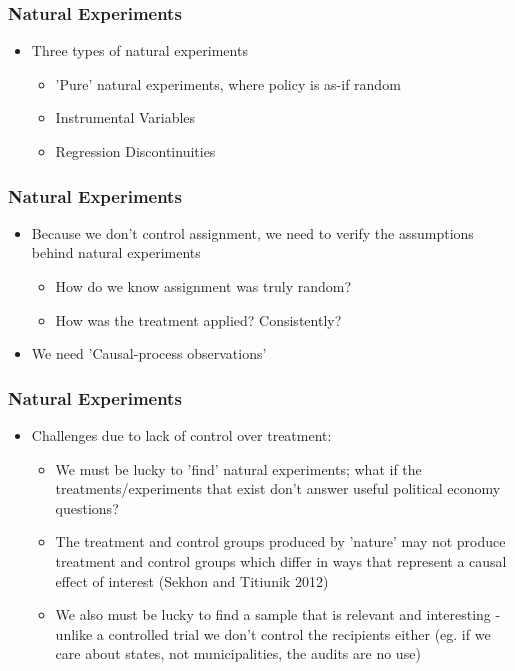 \documentclass[xcolor=x11names,compress]{beamer}\usepackage[]{graphicx}\usepackage[]{color}
\renewcommand{\(}{\begin{columns}}
\renewcommand{\)}{\end{columns}}
\newcommand{\<}[1]{\begin{column}{#1}}
\renewcommand{\>}{\end{column}}
\begin{document}
\begin{frame}
\frametitle{Natural Experiments}
\begin{itemize}
\item Three types of natural experiments
\begin{itemize}
\item 'Pure' natural experiments, where policy is as-if random
\item Instrumental Variables
\item Regression Discontinuities
\end{itemize}
\end{itemize}
\end{frame}

\begin{frame}
\frametitle{Natural Experiments}
\begin{itemize}
\item Because we don't control assignment, we need to verify the assumptions behind natural experiments
\begin{itemize}
\item How do we know assignment was truly random?
\item How was the treatment applied? Consistently?
\end{itemize}
\item We need 'Causal-process observations'
\end{itemize}
\end{frame}

\begin{frame}
\frametitle{Natural Experiments}
\begin{itemize}
\item Challenges due to lack of control over treatment:
\pause
\begin{itemize}
\item We must be lucky to 'find' natural experiments; what if the treatments/experiments that exist don't answer useful political economy questions?
\item The treatment and control groups produced by 'nature' may not produce treatment and control groups which differ in ways that represent a causal effect of interest (Sekhon and Titiunik 2012)
\item We also must be lucky to find a sample that is relevant and interesting - unlike a controlled trial we don't control the recipients either (eg. if we care about states, not municipalities, the audits are no use)
\end{itemize}
\end{itemize}
\end{frame}
\end{document}
